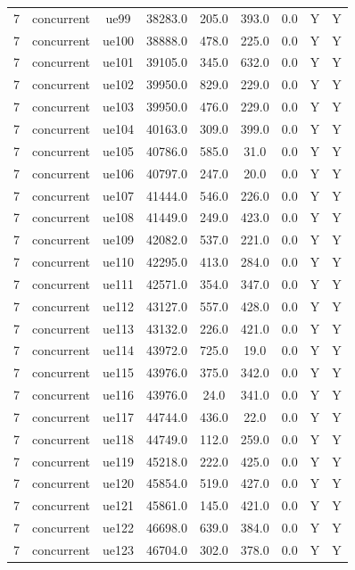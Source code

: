 \begin{table}[ht]
\begin{tabular}{|c|c|c|c|c|c|c|c|c|}
7 & concurrent & ue99 & 38283.0 & 205.0 & 393.0 & 0.0 & Y & Y \\
7 & concurrent & ue100 & 38888.0 & 478.0 & 225.0 & 0.0 & Y & Y \\
7 & concurrent & ue101 & 39105.0 & 345.0 & 632.0 & 0.0 & Y & Y \\
7 & concurrent & ue102 & 39950.0 & 829.0 & 229.0 & 0.0 & Y & Y \\
7 & concurrent & ue103 & 39950.0 & 476.0 & 229.0 & 0.0 & Y & Y \\
7 & concurrent & ue104 & 40163.0 & 309.0 & 399.0 & 0.0 & Y & Y \\
7 & concurrent & ue105 & 40786.0 & 585.0 & 31.0 & 0.0 & Y & Y \\
7 & concurrent & ue106 & 40797.0 & 247.0 & 20.0 & 0.0 & Y & Y \\
7 & concurrent & ue107 & 41444.0 & 546.0 & 226.0 & 0.0 & Y & Y \\
7 & concurrent & ue108 & 41449.0 & 249.0 & 423.0 & 0.0 & Y & Y \\
7 & concurrent & ue109 & 42082.0 & 537.0 & 221.0 & 0.0 & Y & Y \\
7 & concurrent & ue110 & 42295.0 & 413.0 & 284.0 & 0.0 & Y & Y \\
7 & concurrent & ue111 & 42571.0 & 354.0 & 347.0 & 0.0 & Y & Y \\
7 & concurrent & ue112 & 43127.0 & 557.0 & 428.0 & 0.0 & Y & Y \\
7 & concurrent & ue113 & 43132.0 & 226.0 & 421.0 & 0.0 & Y & Y \\
7 & concurrent & ue114 & 43972.0 & 725.0 & 19.0 & 0.0 & Y & Y \\
7 & concurrent & ue115 & 43976.0 & 375.0 & 342.0 & 0.0 & Y & Y \\
7 & concurrent & ue116 & 43976.0 & 24.0 & 341.0 & 0.0 & Y & Y \\
7 & concurrent & ue117 & 44744.0 & 436.0 & 22.0 & 0.0 & Y & Y \\
7 & concurrent & ue118 & 44749.0 & 112.0 & 259.0 & 0.0 & Y & Y \\
7 & concurrent & ue119 & 45218.0 & 222.0 & 425.0 & 0.0 & Y & Y \\
7 & concurrent & ue120 & 45854.0 & 519.0 & 427.0 & 0.0 & Y & Y \\
7 & concurrent & ue121 & 45861.0 & 145.0 & 421.0 & 0.0 & Y & Y \\
7 & concurrent & ue122 & 46698.0 & 639.0 & 384.0 & 0.0 & Y & Y \\
7 & concurrent & ue123 & 46704.0 & 302.0 & 378.0 & 0.0 & Y & Y \\

\end{tabular}
\end{table}
